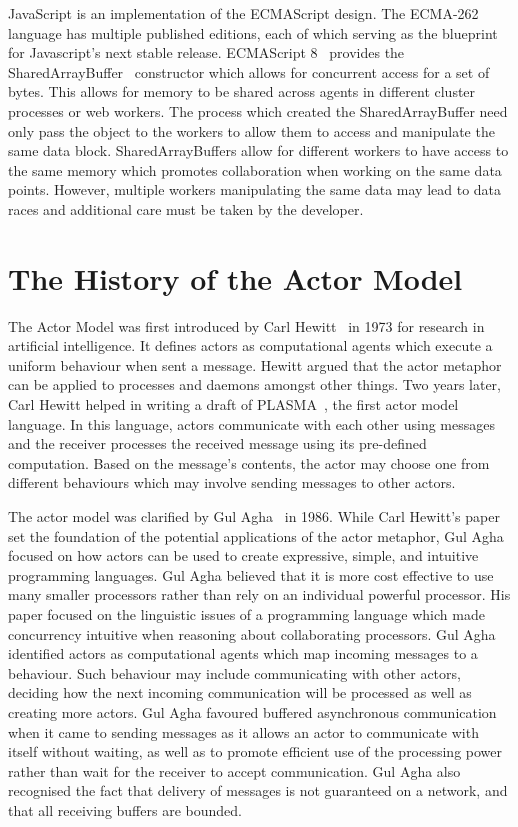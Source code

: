 \documentclass[oneside]{um-fict}
\begin{document}
JavaScript is an implementation of the ECMAScript design. The ECMA-262 language has multiple published editions, each of which serving as the blueprint for Javascript's next stable release. ECMAScript 8~\cite{ecmascript} provides the SharedArrayBuffer~\cite{sharedarraybuffer} constructor which allows for concurrent access for a set of bytes. This allows for memory to be shared across agents in different cluster processes or web workers. The process which created the SharedArrayBuffer need only pass the object to the workers to allow them to access and manipulate the same data block. SharedArrayBuffers allow for different workers to have access to the same memory which promotes collaboration when working on the same data points. However, multiple workers manipulating the same data may lead to data races and additional care must be taken by the developer.

\section{The History of the Actor Model}
The Actor Model was first introduced by Carl Hewitt~\cite{hewitt1973session}\cite{43years} in 1973 for research in artificial intelligence. It defines actors as computational agents which execute a uniform behaviour when sent a message. Hewitt argued that the actor metaphor can be applied to processes and daemons amongst other things. Two years later, Carl Hewitt helped in writing a draft of PLASMA~\cite{plasma}\cite{chewitthowto}, the first actor model language. In this language, actors communicate with each other using messages and the receiver processes the received message using its pre-defined computation. Based on the message's contents, the actor may choose one from different behaviours which may involve sending messages to other actors.

The actor model was clarified by Gul Agha~\cite{agha1985actors} in 1986. While Carl Hewitt's paper set the foundation of the potential applications of the actor metaphor, Gul Agha focused on how actors can be used to create expressive, simple, and intuitive programming languages. Gul Agha believed that it is more cost effective to use many smaller processors rather than rely on an individual powerful processor. His paper focused on the linguistic issues of a programming language which made concurrency intuitive when reasoning about collaborating processors. Gul Agha identified actors as computational agents which map incoming messages to a behaviour. Such behaviour may include communicating with other actors, deciding how the next incoming communication will be processed as well as creating more actors. Gul Agha favoured buffered asynchronous communication when it came to sending messages as it allows an actor to communicate with itself without waiting, as well as to promote efficient use of the processing power rather than wait for the receiver to accept communication. Gul Agha also recognised the fact that delivery of messages is not guaranteed on a network, and that all receiving buffers are bounded.
\end{document}
